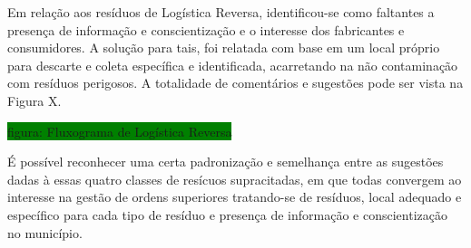 	Em relação aos resíduos de Logística Reversa, identificou-se como faltantes a presença de informação e conscientização e o interesse dos fabricantes e consumidores. A solução para tais, foi relatada com base em um local próprio para descarte e coleta específica e identificada, acarretando na não contaminação com resíduos perigosos. A totalidade de comentários e sugestões pode ser vista na Figura X.
	
	\colorbox{green}{figura: Fluxograma de Logística Reversa}

	É possível reconhecer uma certa padronização e semelhança entre as sugestões dadas à essas quatro classes de resícuos supracitadas, em que todas convergem ao interesse na gestão de ordens superiores tratando-se de resíduos, local adequado e específico para cada tipo de resíduo e presença de informação e conscientização no município.